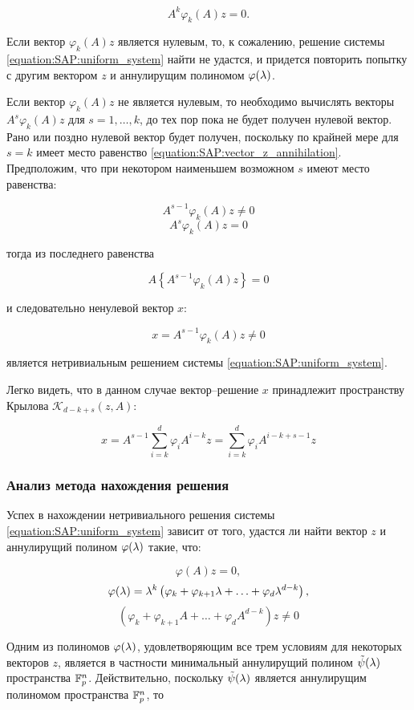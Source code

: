 	\begin{equation} \label{equation:SAP:vector_z_annihilation}
		A^k \varphi_k(A) z = 0.
	\end{equation}

Если вектор $\varphi_k(A) z$ является нулевым, то, к сожалению, решение системы \eqref{equation:SAP:uniform_system} найти не удастся, и
придется повторить попытку с другим вектором $z$ и аннулирущим полиномом $\varphi (\lambda)$.

Если вектор $\varphi_k(A) z$ не является нулевым, то необходимо вычислять векторы $A^s \varphi_k(A) z$ для $s=1,\dots,k$, до тех пор пока
не будет получен нулевой вектор. Рано или поздно нулевой вектор будет получен, поскольку по крайней мере для $s=k$ имеет место равенство
\eqref{equation:SAP:vector_z_annihilation}. Предположим, что при некотором наименьшем возможном $s$ имеют место равенства:

	$$ A^{s-1} \varphi_k(A) z \neq 0 $$
	$$ A^s \varphi_k(A) z = 0 $$

тогда из последнего равенства

	$$ A \left \{ A^{s-1} \varphi_k(A) z \right \} = 0 $$

и следовательно ненулевой вектор $x$:

	$$ x = A^{s-1} \varphi_k(A) z \neq 0 $$

является нетривиальным решением системы \eqref{equation:SAP:uniform_system}.

Легко видеть, что в данном случае вектор--решение $x$ принадлежит пространству Крылова $\mathcal K_{d-k+s}(z,A)$:

	$$ x = A^{s-1} \sum_{i=k}^d \varphi_i A^{i-k} z = \sum_{i=k}^d \varphi_i A^{i-k+s-1} z $$

\subsubsection{Анализ метода нахождения решения}

Успех в нахождении нетривиального решения системы \eqref{equation:SAP:uniform_system} зависит от того, удастся ли найти вектор $z$ и
аннулирущий полином $\varphi (\lambda)$ такие, что:

	$$ \varphi(A) z = 0, $$
	$$ \varphi (\lambda) =
		\lambda^k \left ( \varphi_k + \varphi_{k+1} \lambda + \ldots + \varphi_d \lambda^{d-k} \right ), $$
	$$ \left ( \varphi_k + \varphi_{k+1} A + \ldots + \varphi_d A^{d-k} \right ) z \neq 0 $$

Одним из полиномов $\varphi (\lambda)$, удовлетворяющим все трем условиям для некоторых векторов $z$, является в частности
минимальный аннулирущий полином $\tilde\psi (\lambda)$ пространства $\mathbb{F}^{n}_p$. Действительно, поскольку 
$\tilde\psi (\lambda)$ является аннулирущим полиномом пространства $\mathbb{F}^{n}_p$, то

